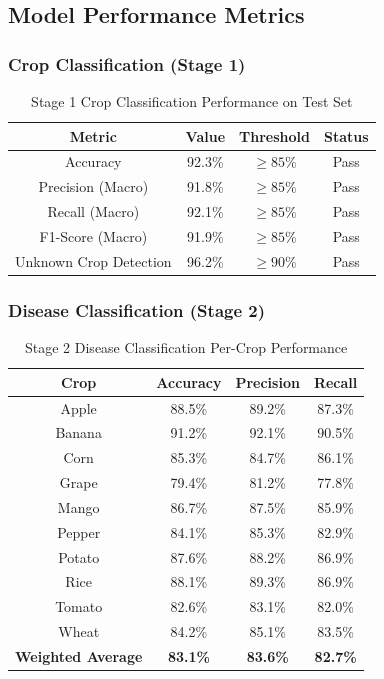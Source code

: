 \documentclass[conference]{IEEEtran}
\begin{document}
\subsection{Model Performance Metrics}

\subsubsection{Crop Classification (Stage 1)}

\begin{table}[H]
\centering
\renewcommand{\arraystretch}{1.3}
\begin{tabular}{|c|c|c|c|}
\hline
\textbf{Metric} & \textbf{Value} & \textbf{Threshold} & \textbf{Status} \\
\hline
Accuracy & 92.3\% & $\geq 85\%$ & Pass \\
Precision (Macro) & 91.8\% & $\geq 85\%$ & Pass \\
Recall (Macro) & 92.1\% & $\geq 85\%$ & Pass \\
F1-Score (Macro) & 91.9\% & $\geq 85\%$ & Pass \\
Unknown Crop Detection & 96.2\% & $\geq 90\%$ & Pass \\
\hline
\end{tabular}
\caption{Stage 1 Crop Classification Performance on Test Set}
\label{tab:stage1}
\end{table}

\subsubsection{Disease Classification (Stage 2)}

\begin{table}[H]
\centering
\renewcommand{\arraystretch}{1.3}
\begin{tabular}{|c|c|c|c|}
\hline
\textbf{Crop} & \textbf{Accuracy} & \textbf{Precision} & \textbf{Recall} \\
\hline
Apple & 88.5\% & 89.2\% & 87.3\% \\
Banana & 91.2\% & 92.1\% & 90.5\% \\
Corn & 85.3\% & 84.7\% & 86.1\% \\
Grape & 79.4\% & 81.2\% & 77.8\% \\
Mango & 86.7\% & 87.5\% & 85.9\% \\
Pepper & 84.1\% & 85.3\% & 82.9\% \\
Potato & 87.6\% & 88.2\% & 86.9\% \\
Rice & 88.1\% & 89.3\% & 86.9\% \\
Tomato & 82.6\% & 83.1\% & 82.0\% \\
Wheat & 84.2\% & 85.1\% & 83.5\% \\
\hline
\textbf{Weighted Average} & \textbf{83.1\%} & \textbf{83.6\%} & \textbf{82.7\%} \\
\hline
\end{tabular}
\caption{Stage 2 Disease Classification Per-Crop Performance}
\label{tab:stage2}
\end{table}
\end{document}

